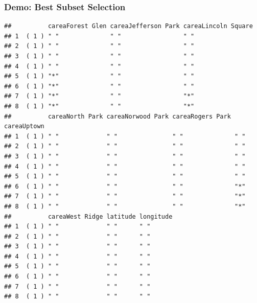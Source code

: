\documentclass[
  shownotes,
  xcolor={svgnames},
  hyperref={colorlinks,citecolor=DarkBlue,linkcolor=DarkRed,urlcolor=DarkBlue}
  , aspectratio=169]{beamer}
\begin{document}
\begin{frame}[fragile]
\frametitle{Demo: Best Subset Selection}
\begin{tiny}
\begin{verbatim}       
##          careaForest Glen careaJefferson Park careaLincoln Square
## 1  ( 1 ) " "              " "                 " "                
## 2  ( 1 ) " "              " "                 " "                
## 3  ( 1 ) " "              " "                 " "                
## 4  ( 1 ) " "              " "                 " "                
## 5  ( 1 ) "*"              " "                 " "                
## 6  ( 1 ) "*"              " "                 " "                
## 7  ( 1 ) "*"              " "                 "*"                
## 8  ( 1 ) "*"              " "                 "*"                
##          careaNorth Park careaNorwood Park careaRogers Park careaUptown
## 1  ( 1 ) " "             " "               " "              " "        
## 2  ( 1 ) " "             " "               " "              " "        
## 3  ( 1 ) " "             " "               " "              " "        
## 4  ( 1 ) " "             " "               " "              " "        
## 5  ( 1 ) " "             " "               " "              " "        
## 6  ( 1 ) " "             " "               " "              "*"        
## 7  ( 1 ) " "             " "               " "              "*"        
## 8  ( 1 ) " "             " "               " "              "*"        
##          careaWest Ridge latitude longitude
## 1  ( 1 ) " "             " "      " "      
## 2  ( 1 ) " "             " "      " "      
## 3  ( 1 ) " "             " "      " "      
## 4  ( 1 ) " "             " "      " "      
## 5  ( 1 ) " "             " "      " "      
## 6  ( 1 ) " "             " "      " "      
## 7  ( 1 ) " "             " "      " "      
## 8  ( 1 ) " "             " "      " "
\end{verbatim}
\end{tiny}
\end{frame}
\end{document}
